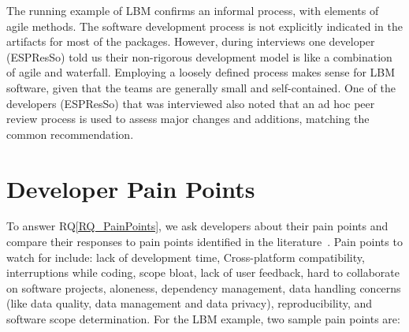 \documentclass[runningheads]{llncs}
\newcommand{\rqref}[1]{RQ\ref{#1}}
\begin{document}
The running example of LBM confirms an informal process, with elements of agile
methods. The software development process is not explicitly indicated in the
artifacts for most of the packages. However, during interviews one developer
(ESPResSo) told us their non-rigorous development model is like a combination of
agile and waterfall. Employing a loosely defined process makes sense for LBM
software, given that the teams are generally small and self-contained. One of
the developers (ESPResSo) that was interviewed also noted that an ad hoc peer
review process is used to assess major changes and additions, matching the
common recommendation.

\section{Developer Pain Points} \label{painpoints}

To answer \rqref{RQ_PainPoints}, we ask developers about their pain points and
compare their responses to pain points identified in the
literature~\cite{WieseEtAl2019,PintoEtAl2018}.  Pain points to watch for
include: lack of development time, Cross-platform compatibility, interruptions
while coding, scope bloat, lack of user feedback, hard to collaborate on
software projects, aloneness, dependency management, data handling concerns
(like data quality, data management and data privacy), reproducibility, and
software scope determination. For the LBM example, two sample pain points are:
\end{document}
